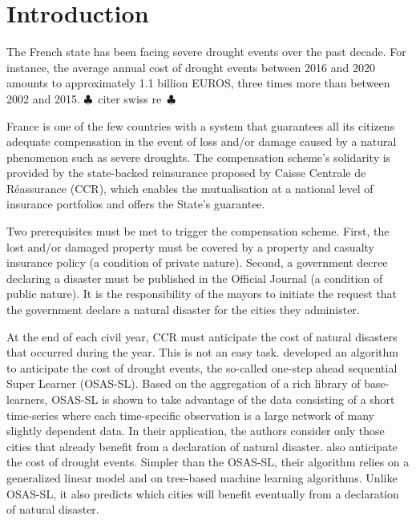 


\section{Introduction}
\label{sec:intro}

The  French  state  has  been  facing severe  drought  events  over  the  past
decade. For instance,  the average annual cost of drought  events between 2016
and 2020  amounts to approximately  1.1 billion  EUROS, three times  more than
between 2002 and 2015. $\clubsuit$~citer swiss re~$\clubsuit$

France is  one of  the few  countries with  a system  that guarantees  all its
citizens adequate compensation in the event  of loss and/or damage caused by a
natural  phenomenon  such  as  severe  droughts.   The  compensation  scheme's
solidarity  is provided  by the  state-backed reinsurance  proposed by  Caisse
Centrale de Réassurance  (CCR), which enables the mutualisation  at a national
level of insurance portfolios and offers the State's guarantee.

Two prerequisites must be met to  trigger the compensation scheme.  First, the
lost  and/or damaged  property  must be  covered by  a  property and  casualty
insurance policy (a condition of  private nature). Second, a government decree
declaring a disaster must be published in the Official Journal (a condition of
public  nature).  It  is  the responsibility  of the  mayors  to initiate  the
request that  the government declare  a natural  disaster for the  cities they
administer.

At  the end  of each  civil  year, CCR  must  anticipate the  cost of  natural
disasters   that  occurred   during   the   year.   This   is   not  an   easy
task. \citet{osasl1,osasl2} developed  an algorithm to anticipate  the cost of
drought  events,  the  so-called   one-step  ahead  sequential  Super  Learner
(OSAS-SL).   Based on  the aggregation  of  a rich  library of  base-learners,
OSAS-SL  is  shown  to take  advantage  of  the  data  consisting of  a  short
time-series where  each time-specific observation  is a large network  of many
slightly  dependent data.   In their  application, the  authors consider  only
those  cities that  already benefit  from a  declaration of  natural disaster.
\citet{Charpentier_2021} also anticipate the  cost of drought events.  Simpler
than the OSAS-SL, their algorithm relies  on a generalized linear model and on
tree-based  machine learning  algorithms.   Unlike OSAS-SL,  it also  predicts
which cities will benefit eventually from a declaration of natural disaster.

